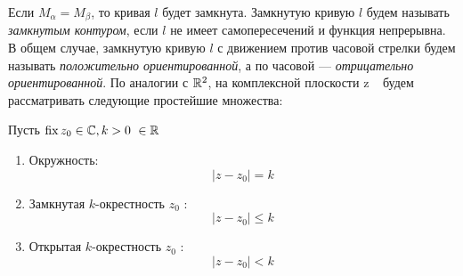 \documentclass[../../main.tex]{subfiles}
\begin{document}
Если  $M_{\alpha} = M_{\beta}$, то кривая $l$ будет замкнута. 
Замкнутую кривую  $l$ будем называть \emph{замкнутым контуром},
если $l$ не имеет самопересечений и функция непрерывна. В общем
случае, замкнутую кривую  $l$ с движением против часовой стрелки
будем называть \emph{положительно ориентированной}, 
а по часовой ---
\emph{отрицательно ориентированной}. По аналогии  с $\mathbb{R}^2$,
 на комплексной плоскости  \textcircled{z} \ будем рассматривать 
следующие  простейшие множества:

Пусть $\operatorname{fix}{z_0}\in \mathbb{C}, k>0\ \in \mathbb{R}$
\begin{enumerate}
\item Окружность: \[  |z - z_0| = k\] 
\item Замкнутая $k$-окрестность $z_0$ : \[ |z - z_0| \leq k\] 
\item Открытая $k$-окрестность $z_0$ : \[ |z - z_0| < k\] 
\end{enumerate}
\end{document}
